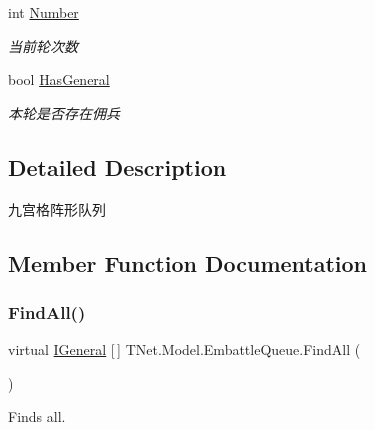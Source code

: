 \begin{DoxyCompactItemize}
int \mbox{\hyperlink{class_t_net_1_1_model_1_1_embattle_queue_aa47598e0b355a8cfd63894c01cdfe3d2}{Number}}
\begin{DoxyCompactList}\small\item\em 当前轮次数 \end{DoxyCompactList}\item 
bool \mbox{\hyperlink{class_t_net_1_1_model_1_1_embattle_queue_a7f896cd7b5c7f5ace0cdc102c8393481}{Has\+General}}
\begin{DoxyCompactList}\small\item\em 本轮是否存在佣兵 \end{DoxyCompactList}\end{DoxyCompactItemize}


\subsection{Detailed Description}
九宫格阵形队列 



\subsection{Member Function Documentation}
\mbox{\label{class_t_net_1_1_model_1_1_embattle_queue_aaa5930044400403f36b6a318b130e43e}} 
\subsubsection{\texorpdfstring{Find\+All()}{FindAll()}\hspace{0.1cm}{\footnotesize\ttfamily [1/2]}}
{\footnotesize\ttfamily virtual \mbox{\hyperlink{interface_t_net_1_1_model_1_1_i_general}{I\+General}} \mbox{[}$\,$\mbox{]} T\+Net.\+Model.\+Embattle\+Queue.\+Find\+All (\begin{DoxyParamCaption}{ }\end{DoxyParamCaption})\hspace{0.3cm}{\ttfamily [virtual]}}



Finds all. 

